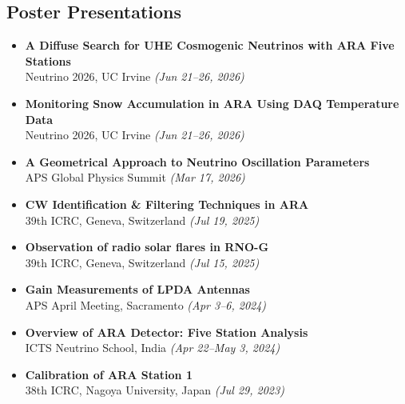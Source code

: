 \documentclass[10pt]{report}
\begin{document}
\subsection*{Poster Presentations}
\begin{itemize}

    \item \textbf{A Diffuse Search for UHE Cosmogenic Neutrinos with ARA Five Stations} \\
    Neutrino 2026, UC Irvine \textit{(Jun 21--26, 2026)}

    \item \textbf{Monitoring Snow Accumulation in ARA Using DAQ Temperature Data} \\
    Neutrino 2026, UC Irvine \textit{(Jun 21--26, 2026)}

    \item \textbf{A Geometrical Approach to Neutrino Oscillation Parameters} \\
    APS Global Physics Summit \textit{(Mar 17, 2026)}
    
    \item \textbf{CW Identification \& Filtering Techniques in ARA} \\
    39th ICRC, Geneva, Switzerland \textit{(Jul 19, 2025)}
    
    \item \textbf{Observation of radio solar flares in RNO-G} \\
    39th ICRC, Geneva, Switzerland \textit{(Jul 15, 2025)}
    
    \item \textbf{Gain Measurements of LPDA Antennas} \\
    APS April Meeting, Sacramento \textit{(Apr 3--6, 2024)}
    
    \item \textbf{Overview of ARA Detector: Five Station Analysis} \\
    ICTS Neutrino School, India \textit{(Apr 22--May 3, 2024)}
    
    \item \textbf{Calibration of ARA Station 1} \\
    38th ICRC, Nagoya University, Japan \textit{(Jul 29, 2023)}
    
\end{itemize}

\end{document}
